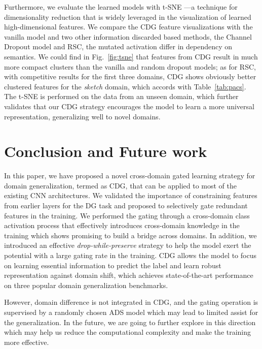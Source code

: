 Furthermore, we evaluate the learned models with t-SNE \citep{maaten2008visualizing}---a technique for dimensionality reduction that is widely leveraged in the visualization of learned high-dimensional features. We compare the CDG feature visualizations with the vanilla model and two other information discarded based methods, \ie the Channel Dropout model and RSC, the mutated activation differ in dependency on semantics. We could find in Fig.~\ref{fig:tsne} that features from CDG result in much more compact clusters than the vanilla and random dropout models; as for RSC, with competitive results for the first three domains, CDG shows obviously better clustered features for the \textit{sketch} domain, which accords with Table~\ref{tab:pacs}. The t-SNE is performed on the data from an unseen domain, which further validates that our CDG strategy encourages the model to learn a more universal representation, generalizing well to novel domains.


\section{Conclusion and Future work}
In this paper, we have proposed a novel cross-domain gated learning strategy for domain generalization, termed as CDG, that can be applied to most of the existing CNN architectures. We validated the importance of constraining features from earlier layers for the DG task and proposed to selectively gate redundant features in the training. We performed the gating through a cross-domain class activation process that effectively introduces cross-domain knowledge in the training which shows promising to build a bridge across domains. In addition, we introduced an effective \textit{drop-while-preserve} strategy to help the model exert the potential with a large gating rate in the training. CDG allows the model to focus on learning essential information to predict the label and learn robust representation against domain shift, which achieves state-of-the-art performance on three popular domain generalization benchmarks. 

However, domain difference is not integrated in CDG, and the gating operation is supervised by a randomly chosen ADS model which may lead to limited assist for the generalization. In the future, we are going to further explore in this direction which may help us reduce the computational complexity and make the training more effective.



